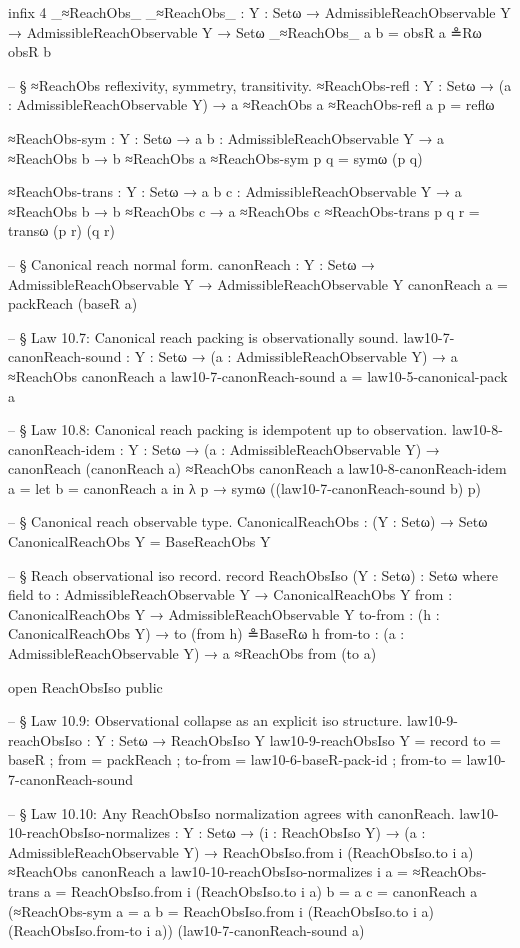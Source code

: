 \documentclass[11pt,a4paper]{book}
\begin{document}
\begin{code}
infix 4 _≈ReachObs_
_≈ReachObs_ : {Y : Setω} → AdmissibleReachObservable Y → AdmissibleReachObservable Y → Setω
_≈ReachObs_ a b = obsR a ≗Rω obsR b

-- § ≈ReachObs reflexivity, symmetry, transitivity.
≈ReachObs-refl : {Y : Setω} → (a : AdmissibleReachObservable Y) → a ≈ReachObs a
≈ReachObs-refl a p = reflω

≈ReachObs-sym : {Y : Setω} → {a b : AdmissibleReachObservable Y} → a ≈ReachObs b → b ≈ReachObs a
≈ReachObs-sym p q = symω (p q)

≈ReachObs-trans : {Y : Setω} → {a b c : AdmissibleReachObservable Y} → a ≈ReachObs b → b ≈ReachObs c → a ≈ReachObs c
≈ReachObs-trans p q r = transω (p r) (q r)

-- § Canonical reach normal form.
canonReach : {Y : Setω} → AdmissibleReachObservable Y → AdmissibleReachObservable Y
canonReach a = packReach (baseR a)

-- § Law 10.7: Canonical reach packing is observationally sound.
law10-7-canonReach-sound :
  {Y : Setω} →
  (a : AdmissibleReachObservable Y) →
  a ≈ReachObs canonReach a
law10-7-canonReach-sound a = law10-5-canonical-pack a

-- § Law 10.8: Canonical reach packing is idempotent up to observation.
law10-8-canonReach-idem :
  {Y : Setω} →
  (a : AdmissibleReachObservable Y) →
  canonReach (canonReach a) ≈ReachObs canonReach a
law10-8-canonReach-idem a =
  let
    b = canonReach a
  in
  λ p → symω ((law10-7-canonReach-sound b) p)

-- § Canonical reach observable type.
CanonicalReachObs : (Y : Setω) → Setω
CanonicalReachObs Y = BaseReachObs Y

-- § Reach observational iso record.
record ReachObsIso (Y : Setω) : Setω where
  field
    to      : AdmissibleReachObservable Y → CanonicalReachObs Y
    from    : CanonicalReachObs Y → AdmissibleReachObservable Y
    to-from : (h : CanonicalReachObs Y) → to (from h) ≗BaseRω h
    from-to : (a : AdmissibleReachObservable Y) → a ≈ReachObs from (to a)

open ReachObsIso public

-- § Law 10.9: Observational collapse as an explicit iso structure.
law10-9-reachObsIso : {Y : Setω} → ReachObsIso Y
law10-9-reachObsIso {Y} = record
  { to      = baseR
  ; from    = packReach
  ; to-from = law10-6-baseR-pack-id
  ; from-to = law10-7-canonReach-sound
  }

-- § Law 10.10: Any ReachObsIso normalization agrees with canonReach.
law10-10-reachObsIso-normalizes :
  {Y : Setω} →
  (i : ReachObsIso Y) →
  (a : AdmissibleReachObservable Y) →
  ReachObsIso.from i (ReachObsIso.to i a) ≈ReachObs canonReach a
law10-10-reachObsIso-normalizes i a =
  ≈ReachObs-trans
    {a = ReachObsIso.from i (ReachObsIso.to i a)}
    {b = a}
    {c = canonReach a}
    (≈ReachObs-sym {a = a} {b = ReachObsIso.from i (ReachObsIso.to i a)} (ReachObsIso.from-to i a))
    (law10-7-canonReach-sound a)


\end{code}
\end{document}
